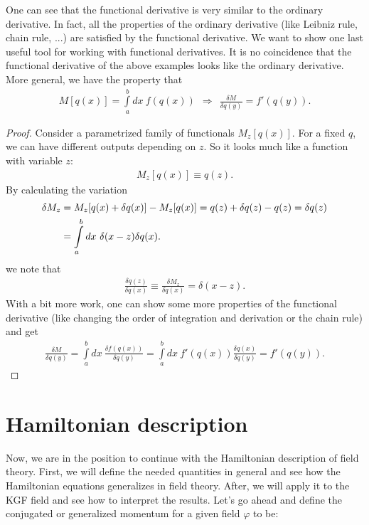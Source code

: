 One can see that the functional derivative is very similar to the ordinary derivative. In fact, all the properties of the ordinary derivative (like Leibniz rule, chain rule, ...) are satisfied by the functional derivative. We want to show one last useful tool for working with functional derivatives. It is no coincidence that the functional derivative of the above examples looks like the ordinary derivative. \\


More general, we have the property that
\begin{align}
M[q(x)] = \displaystyle\int\limits_{a}^{b} dx \ f(q(x)) \ \ \Longrightarrow \ \ \frac{\delta M}{\delta q(y)} = f'(q(y)).
\end{align}

\begin{proof}
Consider a parametrized family of functionals $M_z[q(x)]$. For a fixed $q$, we can have different outputs depending on $z$. So it looks much like a function with variable $z$:
\begin{align}
M_z[q(x)] \equiv q(z).
\end{align}
By calculating the variation
\begin{align}
\delta M_z &= M_z[q(x) + \delta q(x)] - M_z[q(x)] = q(z) + \delta q(z) - q(z) = \delta q(z) \notag \\
&= \displaystyle\int\limits_{a}^{b} dx \ \delta(x-z) \delta q(x).
\end{align}
we note that 
\begin{align}
\frac{\delta q(z)}{\delta q(x)} \equiv \frac{\delta M_z}{\delta q(x)} = \delta(x-z).
\end{align}
With a bit more work, one can show some more properties of the functional derivative (like changing the order of integration and derivation or the chain rule) and get
\begin{align}
\frac{\delta M}{\delta q(y)} = \displaystyle\int\limits_{a}^{b} dx \ \frac{\delta f(q(x))}{\delta q(y)} = \displaystyle\int\limits_{a}^{b} dx \ f'(q(x)) \frac{\delta q(x)}{\delta q(y)} = f'(q(y)). 
\end{align}
\end{proof}



\section{Hamiltonian description}

Now, we are in the position to continue with the Hamiltonian description of field theory. First, we will define the needed quantities in general and see how the Hamiltonian equations generalizes in field theory. After, we will apply it to the KGF field and see how to interpret the results. Let's go ahead and define the conjugated or generalized momentum for a given field $\varphi$ to be:

